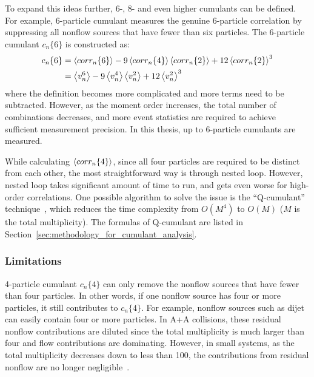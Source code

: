 To expand this ideas further, 6-, 8- and even higher cumulants can be defined. For example, 6-particle cumulant measures the genuine 6-particle correlation by suppressing all nonflow sources that have fewer than six particles. The 6-particle cumulant $c_n\{6\}$ is constructed as:
\begin{equation}
\begin{split}
c_n\{6\} &= \left\langle corr_n\{6\}\right\rangle - 9\left\langle corr_n\{4\}\right\rangle\left\langle corr_n\{2\}\right\rangle + 12\left\langle corr_n\{2\}\right\rangle^3 \\
&= \left\langle v_n^6\right\rangle - 9\left\langle v_n^4\right\rangle\left\langle v_n^2\right\rangle + 12\left\langle v_n^2\right\rangle^3
\end{split}
\end{equation}
where the definition becomes more complicated and more terms need to be subtracted. However, as the moment order increases, the total number of combinations decreases, and more event statistics are required to achieve sufficient measurement precision. In this thesis, up to 6-particle cumulants are measured.

While calculating $\left\langle corr_n\{4\}\right\rangle$, since all four particles are required to be distinct from each other, the most straightforward way is through nested loop. However, nested loop takes significant amount of time to run, and gets even worse for high-order correlations. One possible algorithm to solve the issue is the ``Q-cumulant'' technique~\cite{Bilandzic:2010jr}, which reduces the time complexity from $O(M^4)$ to $O(M)$ ($M$ is the total multiplicity). The formulas of Q-cumulant are listed in Section~\ref{sec:methodology_for_cumulant_analysis}.



\subsubsection{Limitations}

4-particle cumulant $c_n\{4\}$ can only remove the nonflow sources that have fewer than four particles. In other words, if one nonflow source has four or more particles, it still contributes to $c_n\{4\}$. For example, nonflow sources such as dijet can easily contain four or more particles. In A+A collisions, these residual nonflow contributions are diluted since the total multiplicity is much larger than four and flow contributions are dominating. However, in small systems, as the total multiplicity decreases down to less than 100, the contributions from residual nonflow are no longer negligible~\cite{Khachatryan:2015waa, Khachatryan:2016txc, Aad:2013fja, Aidala:2017ajz}.

